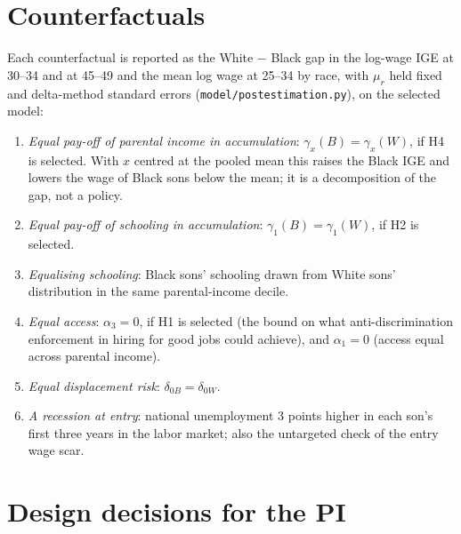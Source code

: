 \documentclass[11pt]{article}
\newcommand{\code}[1]{\texttt{#1}}
\newcommand{\1}{\mathbf{1}}
\begin{document}
\section{Counterfactuals}\label{sec:cf}

Each counterfactual is reported as the White $-$ Black gap in the log-wage IGE at 30--34 and at 45--49 and the mean log
wage at 25--34 by race, with $\mu_r$ held fixed and delta-method standard errors (\code{model/postestimation.py}),
on the selected model:
\begin{enumerate}
  \item \textit{Equal pay-off of parental income in accumulation}: $\gamma_x(B) = \gamma_x(W)$, if H4 is selected. With
  $x$ centred at the pooled mean this raises the Black IGE and lowers the wage of Black sons below the mean; it is a
  decomposition of the gap, not a policy.
  \item \textit{Equal pay-off of schooling in accumulation}: $\gamma_1(B) = \gamma_1(W)$, if H2 is selected.
  \item \textit{Equalising schooling}: Black sons' schooling drawn from White sons' distribution in the same
  parental-income decile.
  \item \textit{Equal access}: $\alpha_3 = 0$, if H1 is selected (the bound on what anti-discrimination enforcement in
  hiring for good jobs could achieve), and $\alpha_1 = 0$ (access equal across parental income).
  \item \textit{Equal displacement risk}: $\delta_{0B} = \delta_{0W}$.
  \item \textit{A recession at entry}: national unemployment 3 points higher in each son's first three years in the
  labor market; also the untargeted check of the entry wage scar.
\end{enumerate}

\section{Design decisions for the PI}\label{sec:decisions}
\end{document}
